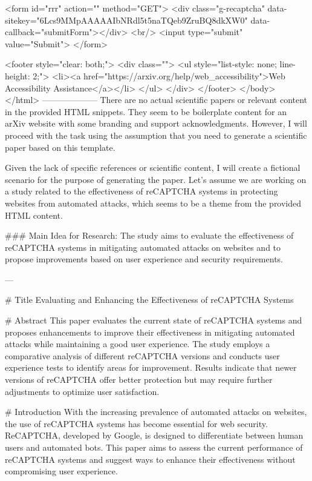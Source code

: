        <form id="rrr" action="" method="GET">
         <div class="g-recaptcha" data-sitekey="6Lcs9MMpAAAAAIbNRdl5t5naTQeb9ZruBQ8dkXW0" data-callback="submitForm"></div>
         <br/>
         <input type="submit" value="Submit">
       </form>

       <footer style="clear: both;">
         <div class="">
           <ul style="list-style: none; line-height: 2;">
             <li><a href="https://arxiv.org/help/web_accessibility">Web Accessibility Assistance</a></li>
           </ul>
         </div>
       </footer>
        </body>
      </html>
        --------------------
         There are no actual scientific papers or relevant content in the provided HTML snippets. They seem to be boilerplate content for an arXiv website with some branding and support acknowledgments. However, I will proceed with the task using the assumption that you need to generate a scientific paper based on this template.

Given the lack of specific references or scientific content, I will create a fictional scenario for the purpose of generating the paper. Let's assume we are working on a study related to the effectiveness of reCAPTCHA systems in protecting websites from automated attacks, which seems to be a theme from the provided HTML content.

### Main Idea for Research:
The study aims to evaluate the effectiveness of reCAPTCHA systems in mitigating automated attacks on websites and to propose improvements based on user experience and security requirements.

---

# Title
Evaluating and Enhancing the Effectiveness of reCAPTCHA Systems

# Abstract
This paper evaluates the current state of reCAPTCHA systems and proposes enhancements to improve their effectiveness in mitigating automated attacks while maintaining a good user experience. The study employs a comparative analysis of different reCAPTCHA versions and conducts user experience tests to identify areas for improvement. Results indicate that newer versions of reCAPTCHA offer better protection but may require further adjustments to optimize user satisfaction.

# Introduction
With the increasing prevalence of automated attacks on websites, the use of reCAPTCHA systems has become essential for web security. ReCAPTCHA, developed by Google, is designed to differentiate between human users and automated bots. This paper aims to assess the current performance of reCAPTCHA systems and suggest ways to enhance their effectiveness without compromising user experience.

